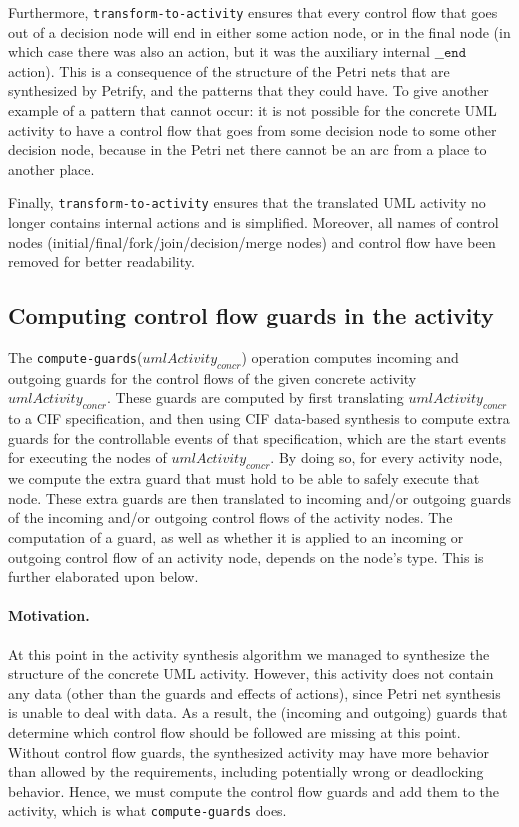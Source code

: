 \documentclass{article}
\newcommand{\keyw}[1]{\texttt{#1}}
\newcommand{\var}[1]{\ensuremath{\mathit{#1}}}
\newcommand{\transformToActivityLabel}[0]{\keyw{transform-to-activity}}
\newcommand{\computeGuardsLabel}[0]{\keyw{compute-guards}}
\newcommand{\computeGuards}[1]{\computeGuardsLabel(\ensuremath{#1})}
\newcommand{\stopLabel}[0]{\texttt{\_\_end}} %
\theoremstyle{definition}
\begin{document}
Furthermore, \transformToActivityLabel{} ensures that every control flow that goes out of a decision node will end in either some action node, or in the final node (in which case there was also an action, but it was the auxiliary internal $\stopLabel$ action).
This is a consequence of the structure of the Petri nets that are synthesized by Petrify, and the patterns that they could have.
To give another example of a pattern that cannot occur: it is not possible for the concrete UML activity to have a control flow that goes from some decision node to some other decision node, because in the Petri net there cannot be an arc from a place to another place.

Finally, \transformToActivityLabel{} ensures that the translated UML activity no longer contains internal actions and is simplified.
Moreover, all names of control nodes (initial/final/fork/join/decision/merge nodes) and control flow have been removed for better readability.

\subsection{Computing control flow guards in the activity}
\label{sec:compute-control-flow-guards}

The \computeGuards{\var{umlActivity_{concr}}} operation computes incoming and outgoing guards for the control flows of the given concrete activity \var{umlActivity_{concr}}.
These guards are computed by first translating \var{umlActivity_{concr}} to a CIF specification, and then using CIF data-based synthesis to compute extra guards for the controllable events of that specification, which are the start events for executing the nodes of \var{umlActivity_{concr}}.
By doing so, for every activity node, we compute the extra guard that must hold to be able to safely execute that node. 
These extra guards are then translated to incoming and/or outgoing guards of the incoming and/or outgoing control flows of the activity nodes.
The computation of a guard, as well as whether it is applied to an incoming or outgoing control flow of an activity node, depends on the node's type.
This is further elaborated upon below.

\paragraph{Motivation.}
At this point in the activity synthesis algorithm we managed to synthesize the structure of the concrete UML activity.
However, this activity does not contain any data (other than the guards and effects of actions), since Petri net synthesis is unable to deal with data.
As a result, the (incoming and outgoing) guards that determine which control flow should be followed are missing at this point.
Without control flow guards, the synthesized activity may have more behavior than allowed by the requirements, including potentially wrong or deadlocking behavior.
Hence, we must compute the control flow guards and add them to the activity, which is what \computeGuardsLabel{} does. 
\end{document}

